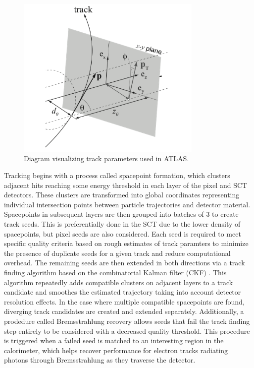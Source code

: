 \begin{figure}
\centering
    \includegraphics[width=0.8\textwidth]{images/Impact_Parameters.png}
    \caption{Diagram visualizing track parameters used in ATLAS.}
    \label{fig:Impact_Parameters}
\end{figure}

Tracking begins with a process called spacepoint formation, which clusters adjacent hits reaching some energy 
threshold in each layer of the pixel and SCT detectors. These clusters are transformed into global coordinates 
representing individual intersection points between particle trajectories and detector material. Spacepoints in 
subsequent layers are then grouped into batches of 3 to create track seeds. This is preferentially done in the SCT 
due to the lower density of spacepoints, but pixel seeds are also considered. Each seed is required to meet specific 
quality criteria based on rough estimates of track paramters to minimize the presence of duplicate seeds for a given 
track and reduce computational overhead. The remaining seeds are then extended in both directions via a track 
finding algorithm based on the combinatorial Kalman filter (CKF) \cite{fruehwirt-kalman-filter}. This algorithm 
repeatedly adds compatible clusters on adjacent layers to a track candidate and smoothes the estimated trajectory 
taking into account detector resolution effects. In the case where multiple compatible spacepoints are found, 
diverging track candidates are created and extended separately. Additionally, a prodedure called Bremsstrahlung 
recovery allows seeds that fail the track finding step entirely to be considered with a decreased quality threshold. 
This procedure is triggered when a failed seed is matched to an interesting region in the calorimeter, which helps 
recover performance for electron tracks radiating photons through Bremsstrahlung as they traverse the detector. \par

